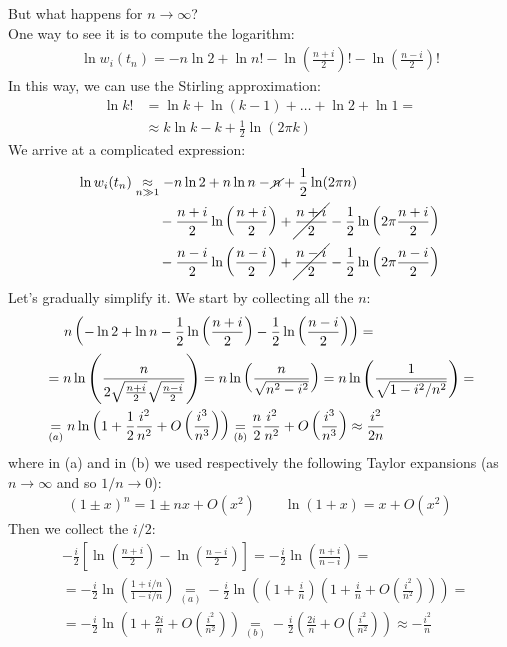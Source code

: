 \documentclass[../template.tex]{subfiles}
\begin{document}
But what happens for $n\to \infty$?\\
One way to see it is to compute the logarithm:
\begin{align*}
    \ln w_i(t_n) = -n \ln 2 + \ln n! - \ln \left(\frac{n+i}{2}\right)! - \ln \left(\frac{n-i}{2}\right)!
\end{align*}
In this way, we can use the Stirling approximation:
\begin{align*}
    \ln k! &= \ln k + \ln(k-1) + \dots + \ln 2 + \ln 1 = \\
    &\approx k\ln k - k  + \frac{1}{2} \ln(2\pi k) 
\end{align*}
We arrive at a complicated expression:
\begin{align*}
    \ln w_i(t_n) &\underset{n \gg 1}{\approx} -n \ln 2 +n\ln n - \cancel{n} + \frac{1}{2}\ln(2\pi n) \\
    &\hphantom{abcd} - \frac{n+i}{2} \ln \left(\frac{n+i}{2} \right) + \cancel{\frac{n+i}{2}} -\frac{1}{2}\ln\left(2 \pi \frac{n+i}{2} \right)  \\
    &\hphantom{abcd} -\frac{n-i}{2} \ln\left(\frac{n-i}{2} \right) +\cancel{\frac{n-i}{2}} - \frac{1}{2}\ln\left(2 \pi \frac{n-i}{2} \right)   
\end{align*}
Let's gradually simplify it. We start by collecting all the $n$:
\begin{align} \nonumber
    &\hphantom{abc}n\left(-\ln 2 + \ln n - \frac{1}{2}\ln\left(\frac{n+i}{2} \right) -\frac{1}{2}\ln\left(\frac{n-i}{2} \right) \right) =  \\ \nonumber
    &= n \ln \left(\frac{n}{2 \sqrt{\frac{n+i}{2} }\sqrt{\frac{n-i}{2} }} \right) = n \ln \left(\frac{n}{\sqrt{n^2 - i^2}} \right) = n\ln \left(\frac{1}{\sqrt{1-i^2/n^{2}}} \right) = \\
    &\underset{(a)}{=} n \ln \left(1 + \frac{1}{2}\frac{i^2}{n^2} + O\left(\frac{i^3}{n^3} \right)  \right) \underset{(b)}{=}  \frac{n}{2} \frac{i^2}{n^2} + O\left(\frac{i^3}{n^3} \right) \approx \frac{i^2}{2n} 
    \label{eqn:piece1}
\end{align} 
where in (a) and in (b) we used respectively the following Taylor expansions (as $n \to \infty$ and so $1/n \to 0$):
\begin{align*}
    (1\pm x)^n = 1 \pm nx + O(x^2) \qquad \ln(1+x) = x + O(x^2)
\end{align*}
Then we collect the $i/2$:
\begin{align} \nonumber
    &-\frac{i}{2} \left[\ln\left(\frac{n+i}{2} \right)-\ln\left(\frac{n-i}{2} \right)\right]  = -\frac{i}{2} \ln\left(\frac{n+i}{n-i}  \right) =\\ \nonumber
    &= -\frac{i}{2}\ln\left(\frac{1 + i/n}{1 - i/n}\right) \underset{(a)}{=}  -\frac{i}{2} \ln\left(\left(1+\frac{i}{n} \right)\left(1+\frac{i}{n} + O\left(\frac{i^2}{n^2} \right)\right)\right) =\\
    &=-\frac{i}{2} \ln\left(1+\frac{2i}{n} + O\left(\frac{i^2}{n^2} \right) \right) \underset{(b)}{=} -\frac{i}{2} \left(\frac{2i}{n} + O\left(\frac{i^2}{n^2} \right) \right) \approx -\frac{i^2}{n} 
    \label{eqn:piece2}
\end{align} 
\end{document}
